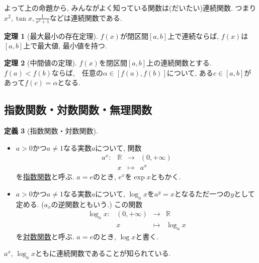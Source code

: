\documentclass[dvipdfmx,a4paper,11pt]{article}
\newcommand{\R}{\mathbb{R}}
\theoremstyle{definition}
\newtheorem{thm}{定理}
\newtheorem{dfn}[thm]{定義}
\begin{document}
   よって上の命題から, みんながよく知っている関数は(だいたい)連続関数. つまり$x^2, \tan x, \frac{1}{x^2 +1}$などは連続関数である. 


   \begin{tcolorbox}[
    colback = white,
    colframe = green!35!black,
    fonttitle = \bfseries,
    breakable = true]
    \begin{thm}[最大最小の存在定理]
$f(x)$が閉区間$[a,b]$上で連続ならば, $f(x)$は$[a,b]$上で最大値, 最小値を持つ.
 \end{thm}
   \end{tcolorbox}

 
    \begin{tcolorbox}[
    colback = white,
    colframe = green!35!black,
    fonttitle = \bfseries,
    breakable = true]
    \begin{thm}[中間値の定理]
$f(x)$を閉区間$[a,b]$上の連続関数とする.
$f(a) < f(b)$ならば,　任意の$\alpha \in [f(a), f(b)]$について, ある$c \in [a,b]$があって$f(c) = \alpha$となる.
 \end{thm}
   \end{tcolorbox}
   
 \subsection{指数関数・対数関数・無理関数}


   
   
\begin{tcolorbox}[
    colback = white,
    colframe = green!35!black,
    fonttitle = \bfseries,
    breakable = true]
    \begin{dfn}[指数関数・対数関数]
    \text{}
 \begin{itemize}
\item $a>0$かつ$a \neq 1$なる実数$a$について, 関数
$$
\begin{array}{cccc}
a^x: &\R& \rightarrow & (0, + \infty)  \\
&x& \longmapsto & a^x
\end{array}
$$
を\underline{指数関数}と呼ぶ.
$a=e$のとき, $e^x$を$\exp x$ともかく.

\item  $a>0$かつ$a \neq 1$なる実数$a$について, $\log_{a} x$を$a^{y}=x$となるただ一つの$y$として定める. ($a_x$の逆関数ともいう.)
この関数
$$
\begin{array}{cccc}
\log_{a} x: &(0, + \infty) & \rightarrow & \R \\
&x& \longmapsto & \log_{a} x
\end{array}
$$
を\underline{対数関数}と呼ぶ.
$a=e$のとき, $\log x$と書く.
 \end{itemize}
 \end{dfn}
   \end{tcolorbox}
   $a^{x}$, $\log_{a} x$ともに連続関数であることが知られている. 
   
\end{document}
